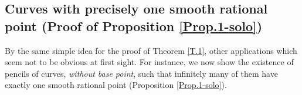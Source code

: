 \documentclass[leqno,12pt]{article} %
\def\Q{{{\mathbb Q}}}
\def\G{{{\mathbb G}}}
\def\F{{{\mathbb F}}}
\theoremstyle{plain} %
\theoremstyle{definition} %
\begin{document}
 
 
 
 
  
 

\subsection{ Curves with precisely one smooth rational point (Proof of Proposition \ref{Prop.1-solo})}   
 By the same  simple  idea  for the proof of Theorem \ref{T.1}, other applications which seem not to be obvious at first sight. For instance, we now show  the existence of pencils of curves, {\it without base point}, such that infinitely many of them have exactly one smooth rational point (Proposition \ref{Prop.1-solo}).

 

 
\end{document}

